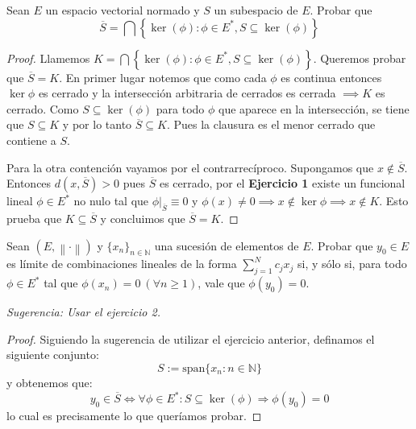 \documentclass{article}
\theoremstyle{definition}
\newcommand{\N}{\mathbb{N}}
\newcommand{\norm}[1]{\left\lVert #1 \right\rVert}       %
\newcommand{\cl}[1]{\overline{#1}}                       %
\newcommand{\EN}[1][E]{(#1,\norm{\cdot})}                %
\newenvironment{ejercicio}[1]{\begin{trivlist}
\item[\hskip \labelsep {\bfseries Ejercicio}\hskip \labelsep {\bfseries #1.}]}{\end{trivlist}}
\begin{document}
\vspace{0.5cm}

\begin{ejercicio}{2}
    Sean \(E\) un espacio vectorial normado y \(S\) un subespacio de \(E\). Probar que \[ \cl{S}= \bigcap \left \{ \ker(\phi):\phi\in E^{*},S\subseteq \ker(\phi) \right \} \]
\end{ejercicio}
\begin{proof}
    Llamemos \( K = \bigcap \left \{ \ker(\phi):\phi\in E^{*},S\subseteq \ker(\phi) \right \} \). Queremos probar que \( \cl{S} = K \). En primer lugar notemos que como cada \( \phi \) es continua entonces \( \ker \phi \) es cerrado y la intersección arbitraria de cerrados es cerrada \( \implies K \) es cerrado. Como \( S \subseteq \ker(\phi) \) para todo \( \phi \) que aparece en la intersección, se tiene que \( S \subseteq K \) y por lo tanto \( \cl{S} \subseteq K \). Pues la clausura es el menor cerrado que contiene a \( S \).

    Para la otra contención vayamos por el contrarrecíproco. Supongamos que \( x \notin \cl{S} \). Entonces \( d(x, \cl{S}) > 0 \) pues \( \cl{S} \) es cerrado, por el \textbf{Ejercicio 1} existe un funcional lineal \( \phi \in E^* \) no nulo tal que \( \phi|_{\cl{S}} \equiv 0 \) y \( \phi(x) \neq 0 \implies x \notin \ker \phi \implies x \notin K \). Esto prueba que \( K \subseteq \cl{S} \) y concluimos que \( \cl{S} = K \).
\end{proof}

\vspace{0.5cm}

\begin{ejercicio}{3}
    Sean \( \EN \) y \( {\{x_n\}}_{n\in\N}\) una sucesión de elementos de \(E\). Probar que \(y_0 \in E\) es límite de combinaciones lineales de la forma \( \sum_{j=1}^N c_j x_j\) si, y sólo si, para todo \(\phi\in E^{*}\) tal que \(\phi(x_n) = 0 \ (\forall n\ge1)\), vale que \(\phi(y_0)=0\).

    \textit{Sugerencia: Usar el ejercicio 2.}
\end{ejercicio}
\begin{proof}
    Siguiendo la sugerencia de utilizar el ejercicio anterior, definamos el siguiente conjunto: \[
        S := \text{span}\{ x_n : n \in \N \}
    \]
    y obtenemos que:
    \[
        y_0 \in \cl{S} \iff \forall \phi \in E^* : S \subseteq \ker(\phi) \Rightarrow \phi(y_0) = 0
    \]
    lo cual es precisamente lo que queríamos probar.
\end{proof}
\end{document}
